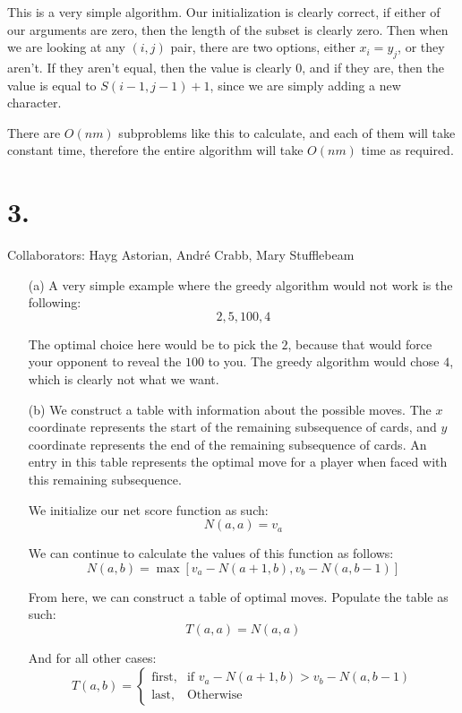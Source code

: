 \documentclass[11pt]{article}
\begin{document}
This is a very simple algorithm. Our initialization is clearly correct, if
either of our arguments are zero, then the length of the subset is clearly zero.
Then when we are looking at any $(i, j)$ pair, there are two options, either
$x_i = y_j$, or they aren't. If they aren't equal, then the value is clearly
$0$, and if they are, then the value is equal to $S(i-1, j-1) + 1$, since we are
simply adding a new character. 

There are $O(nm)$ subproblems like this to calculate, and each of them will take
constant time, therefore the entire algorithm will take $O(nm)$ time as
required.
\newpage
\section*{3.}
Collaborators: Hayg Astorian, Andr\'e Crabb, Mary Stufflebeam
\begin{enumerate}
\item[(a)]
A very simple example where the greedy algorithm would not work is the
following:
\begin{equation*}
2, 5, 100, 4
\end{equation*}

The optimal choice here would be to pick the $2$, because that would force your
opponent to reveal the $100$ to you. The greedy algorithm would chose $4$, which
is clearly not what we want. 
\item[(b)]
We construct a table with information about the possible moves. The $x$
coordinate represents the start of the remaining subsequence of cards, and $y$
coordinate represents the end of the remaining subsequence of cards. An entry in
this table represents the optimal move for a player when faced with this
remaining subsequence.

We initialize our net score function as such:
\begin{equation*}
N(a, a) = v_a
\end{equation*}

We can continue to calculate the values of this function as follows:
\begin{equation*}
N(a, b) = \max[v_a - N(a+1, b), v_b - N(a, b-1)]
\end{equation*}

From here, we can construct a table of optimal moves. Populate the table as
such:
\begin{equation*}
T(a, a) = N(a, a)
\end{equation*}

And for all other cases:
\begin{equation*}
T(a, b) =
\begin{cases}
\text{first}, & \text{if } v_a - N(a+1, b) > v_b - N(a, b-1)\\
\text{last}, & \text{Otherwise}
\end{cases}
\end{equation*}
\end{enumerate}
\end{document}
